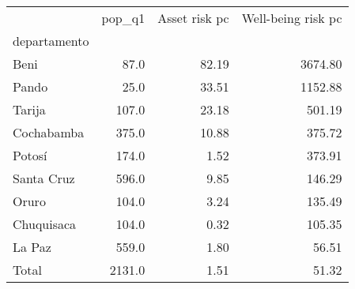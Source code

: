 \begin{tabular}{lrrr}
\toprule
{} &  pop\_q1 &  Asset risk pc &  Well-being risk pc \\
departamento &         &                &                     \\
\midrule
Beni         &    87.0 &          82.19 &             3674.80 \\
Pando        &    25.0 &          33.51 &             1152.88 \\
Tarija       &   107.0 &          23.18 &              501.19 \\
Cochabamba   &   375.0 &          10.88 &              375.72 \\
Potosí       &   174.0 &           1.52 &              373.91 \\
Santa Cruz   &   596.0 &           9.85 &              146.29 \\
Oruro        &   104.0 &           3.24 &              135.49 \\
Chuquisaca   &   104.0 &           0.32 &              105.35 \\
La Paz       &   559.0 &           1.80 &               56.51 \\
Total        &  2131.0 &           1.51 &               51.32 \\
\bottomrule
\end{tabular}
